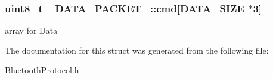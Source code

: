 \subsubsection[{\texorpdfstring{cmd}{cmd}}]{\setlength{\rightskip}{0pt plus 5cm}uint8\+\_\+t \+\_\+\+D\+A\+T\+A\+\_\+\+P\+A\+C\+K\+E\+T\+\_\+\+::cmd\mbox{[}{\bf D\+A\+T\+A\+\_\+\+S\+I\+ZE} $\ast$3\mbox{]}}\hypertarget{struct___d_a_t_a___p_a_c_k_e_t___aa49ae45ff84ed4ccde15cb0a69ae679f}{}\label{struct___d_a_t_a___p_a_c_k_e_t___aa49ae45ff84ed4ccde15cb0a69ae679f}
array for Data 

The documentation for this struct was generated from the following file\+:\begin{DoxyCompactItemize}
\item 
\hyperlink{_bluetooth_protocol_8h}{Bluetooth\+Protocol.\+h}\end{DoxyCompactItemize}
